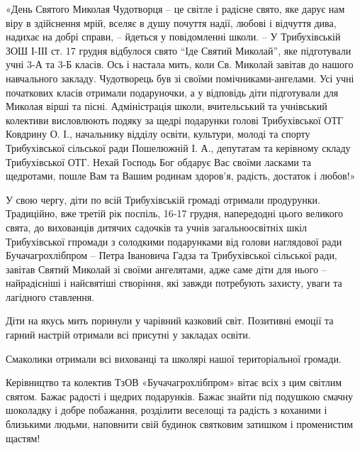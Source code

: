 
«День Святого Миколая Чудотворця – це світле і радісне свято, яке дарує нам
віру в здійснення мрій, вселяє в душу почуття надії, любові і відчуття дива,
надихає на добрі справи, – йдеться у повідомленні школи. – У Трибухівській ЗОШ
І-ІІІ ст. 17 грудня відбулося свято \enquote{Іде Святий Миколай}, яке підготували учні
3-А та 3-Б класів. Ось і настала мить, коли Св. Миколай завітав до нашого
навчального закладу. Чудотворець був зі своїми помічниками-ангелами. Усі учні
початкових класів отримали подаруночки, а у відповідь діти підготували для
Миколая вірші та пісні. Адміністрація школи, вчительський та учнівський
колективи висловлюють подяку за щедрі подарунки голові Трибухівської ОТГ
Ковдрину О. І., начальнику відділу освіти, культури, молоді та спорту
Трибухівської сільської ради Пошелюжній І. А., депутатам та керівному складу
Трибухівської ОТГ. Нехай Господь Бог обдарує Вас своїми ласками та щедротами,
пошле Вам та Вашим родинам здоров’я, радість, достаток і любов!»


У свою чергу, діти по всій Трибухівській громаді отримали продурунки.
Традиційно, вже третій рік поспіль, 16-17 грудня, напередодні цього великого
свята, до вихованців дитячих садочків та учнів загальноосвітніх шкіл
Трибухівської гпромади з солодкими подарунками від голови наглядової ради
Бучачагрохлібпром – Петра Івановича Гадза та Трибухівської сільської ради,
завітав Святий Миколай зі своїми ангелятами, адже саме діти для нього –
найрадісніші і найсвятіші створіння, які завжди потребують захисту, уваги та
лагідного ставлення.


Діти на якусь мить поринули у чарівний казковий світ. Позитивні емоції та
гарний настрій отримали всі присутні у закладах освіти.

Смаколики отримали всі вихованці та школярі нашої територіальної громади.

Керівництво та колектив ТзОВ «Бучачагрохлібпром» вітає всіх з цим світлим
святом. Бажає радості і щедрих подарунків. Бажає знайти під подушкою смачну
шоколадку і добре побажання, розділити веселощі та радість з коханими і
близькими людьми, наповнити свій будинок святковим затишком і променистим
щастям!

